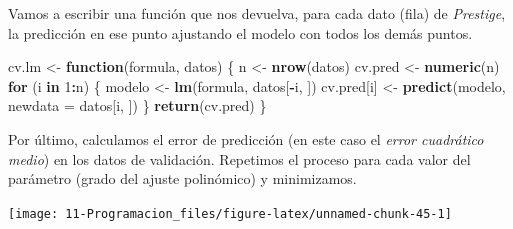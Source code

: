 \documentclass[]{book}
\newenvironment{Shaded}{\begin{snugshade}}{\end{snugshade}}
\newcommand{\KeywordTok}[1]{\textcolor[rgb]{0.13,0.29,0.53}{\textbf{#1}}}
\newcommand{\DataTypeTok}[1]{\textcolor[rgb]{0.13,0.29,0.53}{#1}}
\newcommand{\DecValTok}[1]{\textcolor[rgb]{0.00,0.00,0.81}{#1}}
\newcommand{\StringTok}[1]{\textcolor[rgb]{0.31,0.60,0.02}{#1}}
\newcommand{\ControlFlowTok}[1]{\textcolor[rgb]{0.13,0.29,0.53}{\textbf{#1}}}
\newcommand{\OperatorTok}[1]{\textcolor[rgb]{0.81,0.36,0.00}{\textbf{#1}}}
\newcommand{\NormalTok}[1]{#1}
\begin{document}
Vamos a escribir una función que nos devuelva, para cada dato (fila) de
\emph{Prestige}, la predicción en ese punto ajustando el modelo con
todos los demás puntos.

\begin{Shaded}
\begin{Highlighting}[]
\NormalTok{cv.lm <-}\StringTok{ }\ControlFlowTok{function}\NormalTok{(formula, datos) \{}
\NormalTok{      n <-}\StringTok{ }\KeywordTok{nrow}\NormalTok{(datos)}
\NormalTok{      cv.pred <-}\StringTok{ }\KeywordTok{numeric}\NormalTok{(n)}
      \ControlFlowTok{for}\NormalTok{ (i }\ControlFlowTok{in} \DecValTok{1}\OperatorTok{:}\NormalTok{n) \{}
\NormalTok{          modelo <-}\StringTok{ }\KeywordTok{lm}\NormalTok{(formula, datos[}\OperatorTok{-}\NormalTok{i, ])}
\NormalTok{          cv.pred[i] <-}\StringTok{ }\KeywordTok{predict}\NormalTok{(modelo, }\DataTypeTok{newdata =}\NormalTok{ datos[i, ])}
\NormalTok{      \}}
      \KeywordTok{return}\NormalTok{(cv.pred)}
\NormalTok{\}}
\end{Highlighting}
\end{Shaded}

Por último, calculamos el error de predicción (en este caso el
\emph{error cuadrático medio}) en los datos de validación. Repetimos el
proceso para cada valor del parámetro (grado del ajuste polinómico) y
minimizamos.

\begin{Shaded}
\end{Shaded}

\begin{center}\texttt{[image: 11-Programacion\_files/figure-latex/unnamed-chunk-45-1]} \end{center}
\end{document}

